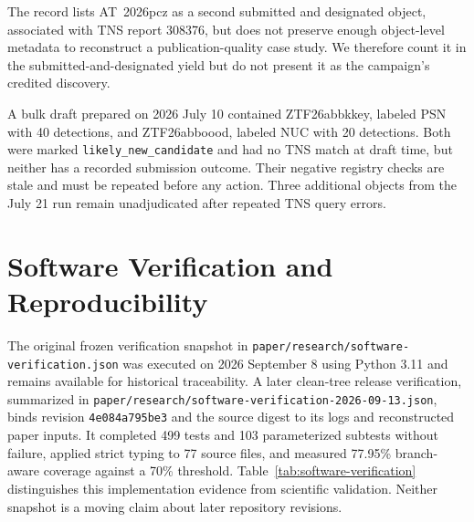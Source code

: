 \documentclass[11pt]{article}
\begin{document}
The record lists AT~2026pcz as a second submitted and designated object, associated with TNS report 308376, but does not preserve enough object-level metadata to reconstruct a publication-quality case study. We therefore count it in the submitted-and-designated yield but do not present it as the campaign's credited discovery.

A bulk draft prepared on 2026 July 10 contained ZTF26abbkkey, labeled PSN with 40 detections, and ZTF26abboood, labeled NUC with 20 detections. Both were marked \texttt{likely\_new\_candidate} and had no TNS match at draft time, but neither has a recorded submission outcome. Their negative registry checks are stale and must be repeated before any action. Three additional objects from the July 21 run remain unadjudicated after repeated TNS query errors.

\section{Software Verification and Reproducibility}
\label{sec:software-verification}

The original frozen verification snapshot in \texttt{paper/research/software-verification.json} was executed on 2026 September 8 using Python 3.11 and remains available for historical traceability. A later clean-tree release verification, summarized in \texttt{paper/research/software-verification-2026-09-13.json}, binds revision \texttt{4e084a795be3} and the source digest to its logs and reconstructed paper inputs. It completed 499 tests and 103 parameterized subtests without failure, applied strict typing to 77 source files, and measured 77.95\% branch-aware coverage against a 70\% threshold. Table~\ref{tab:software-verification} distinguishes this implementation evidence from scientific validation. Neither snapshot is a moving claim about later repository revisions.
\end{document}
